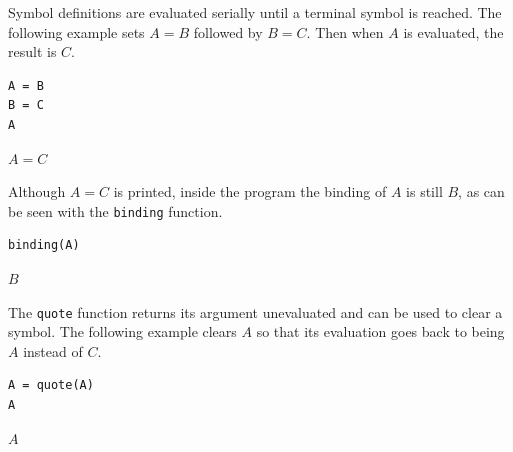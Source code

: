 \bigskip

Symbol definitions are evaluated serially until a terminal symbol is reached.
The following example sets $A=B$ followed by $B=C$.
Then when $A$ is evaluated, the result is $C$.

{\color{blue}
\begin{verbatim}
A = B
B = C
A
\end{verbatim}
}

$\displaystyle A=C$

\bigskip

Although $A=C$ is printed,
inside the program the binding of $A$ is still $B$, as can be seen with
the \verb$binding$ function.

{\color{blue}
\begin{verbatim}
binding(A)
\end{verbatim}
}

$\displaystyle B$

\bigskip

The \verb$quote$ function returns its argument unevaluated
and can be used to clear a symbol.
The following example clears $A$ so that its evaluation goes back to
being $A$ instead of $C$.

{\color{blue}
\begin{verbatim}
A = quote(A)
A
\end{verbatim}
}

$\displaystyle A$


